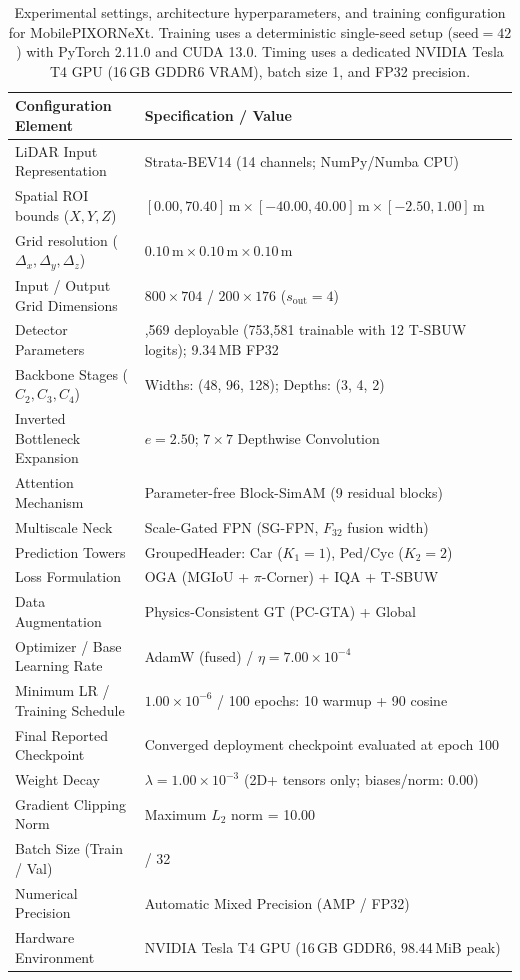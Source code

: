 \begin{table}[t]
\centering\small
\caption{Experimental settings, architecture hyperparameters, and training configuration for MobilePIXORNeXt. Training uses a deterministic single-seed setup ($\text{seed} = 42$) with PyTorch 2.11.0 and CUDA 13.0. Timing uses a dedicated NVIDIA Tesla T4 GPU (16\,GB GDDR6 VRAM), batch size 1, and FP32 precision.}
\label{tab:setup}
\begin{tabular}{@{}>{\raggedright\arraybackslash}p{}>{\raggedright\arraybackslash}p{}@{}}
\toprule
\textbf{Configuration Element} & \textbf{Specification / Value} \\
\midrule
LiDAR Input Representation & Strata-BEV14 (14 channels; NumPy/Numba CPU) \\
Spatial ROI bounds ($X, Y, Z$) & $[0.00, 70.40]\,\text{m} \times [-40.00, 40.00]\,\text{m} \times [-2.50, 1.00]\,\text{m}$ \\
Grid resolution ($\Delta_x, \Delta_y, \Delta_z$) & $0.10\,\text{m} \times 0.10\,\text{m} \times 0.10\,\text{m}$ \\
Input / Output Grid Dimensions & $800 \times 704$ / $200 \times 176$ ($s_{\mathrm{out}} = 4$) \\
Detector Parameters & 753,569 deployable (753,581 trainable with 12 T-SBUW logits); 9.34\,MB FP32 \\
Backbone Stages ($C_2, C_3, C_4$) & Widths: (48, 96, 128); Depths: (3, 4, 2) \\
Inverted Bottleneck Expansion & $e = 2.50$; $7 \times 7$ Depthwise Convolution \\
Attention Mechanism & Parameter-free Block-SimAM (9 residual blocks) \\
Multiscale Neck & Scale-Gated FPN (SG-FPN, $F_{32}$ fusion width) \\
Prediction Towers & GroupedHeader: Car ($K_1=1$), Ped/Cyc ($K_2=2$) \\
Loss Formulation & OGA (MGIoU + $\pi$-Corner) + IQA + T-SBUW \\
Data Augmentation & Physics-Consistent GT (PC-GTA) + Global \\
Optimizer / Base Learning Rate & AdamW (fused) / $\eta = 7.00 \times 10^{-4}$ \\
Minimum LR / Training Schedule & $1.00 \times 10^{-6}$ / 100 epochs: 10 warmup + 90 cosine \\
Final Reported Checkpoint & Converged deployment checkpoint evaluated at epoch 100 \\
Weight Decay & $\lambda = 1.00 \times 10^{-3}$ (2D+ tensors only; biases/norm: 0.00) \\
Gradient Clipping Norm & Maximum $L_2$ norm = 10.00 \\
Batch Size (Train / Val) & 16 / 32 \\
Numerical Precision & Automatic Mixed Precision (AMP / FP32) \\
Hardware Environment & NVIDIA Tesla T4 GPU (16\,GB GDDR6, 98.44\,MiB peak) \\
\bottomrule
\end{tabular}
\end{table}
